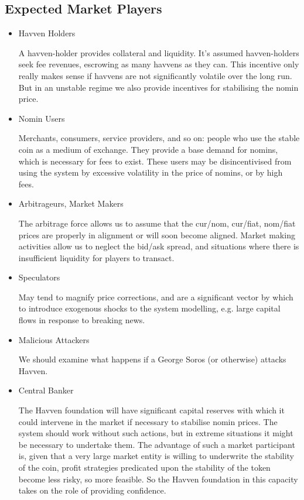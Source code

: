 \subsection{Expected Market Players}

\begin{itemize}
	\item{Havven Holders}

	A havven-holder provides collateral and liquidity. It’s assumed havven-holders seek fee revenues,
	escrowing as many havvens as they can. This incentive only really makes sense if havvens are not
	significantly volatile over the long run. But in an unstable regime we also provide incentives
	for stabilising the nomin price. 

	\item{Nomin Users}

	Merchants, consumers, service providers, and so on: people who use the stable coin as a
	medium of exchange. They provide a base demand for nomins, which is necessary for fees
	to exist. These users may be disincentivised from using the system by excessive volatility
	in the price of nomins, or by high fees.

	\item{Arbitrageurs, Market Makers}

	The arbitrage force allows us to assume that the cur/nom, cur/fiat, nom/fiat
	prices are properly in alignment or will soon become aligned. Market making activities
	allow us to neglect the bid/ask spread, and situations where there is insufficient
	liquidity for players to transact.
	
	\item{Speculators}
	
	May tend to magnify price corrections, and are a significant vector by which to introduce
	exogenous shocks to the system modelling, e.g. large capital flows in response to breaking news.
	
	\item{Malicious Attackers}
	
	We should examine what happens if a George Soros (or otherwise) attacks Havven.

	\item{Central Banker}
	
	The Havven foundation will have significant capital reserves with which it could intervene
	in the market if necessary to stabilise nomin prices. The system should work without
	such actions, but in extreme situations it might be necessary to undertake them.
	The advantage of such a market participant is, given that a very large market entity is
	willing to underwrite the stability of the coin, profit strategies predicated upon the
	stability of the token become less risky, so more feasible. So the Havven foundation in
	this capacity takes on the role of providing confidence.

\end{itemize}



\pagebreak